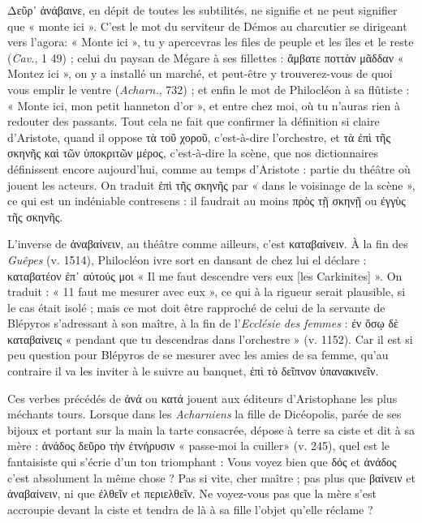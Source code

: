 \documentclass{book}%
\newcommand{\italique}[1]{\textit{#1}}%
\begin{document}
Δεῦρ᾽ ἀνάβαινε, en dépit de toutes les subtilités, ne signifie et ne peut signifier que « monte ici ». C'est le mot du serviteur de Démos au charcutier se dirigeant vers l'agora: « Monte ici », tu y apercevras les files de peuple et les îles et le reste (\italique{Cav.}, 1 49) ; celui du paysan de Mégare à ses fillettes : ἄμβατε ποττὰν μᾶδδαν « Montez ici », on y a installé un marché, et peut-être y trouverez-vous de quoi vous emplir le ventre (\italique{Acharn.}, 732) ; et enfin le mot de Philocléon à sa flûtiste : « Monte ici, mon petit hanneton d'or », et entre chez moi, où tu n'auras rien à redouter des passants. 
Tout cela ne fait que confirmer la définition si claire d'Aristote, quand il oppose τὰ τοῦ χοροῦ, c'est-à-dire l'orchestre, et τὰ ἐπὶ τῆς σκηνῆς καὶ τῶν ὑποκριτῶν μέρος, c'est-à-dire la scène, que nos dictionnaires définissent encore aujourd'hui, comme au temps d'Aristote : partie du théâtre où jouent les acteurs. 
On traduit ἐπὶ τῆς σκηνῆς par « dans le voisinage de la scène », ce qui est un indéniable contresens : il faudrait au moins πρὸς τῇ σκηνῇ ou ἐγγὺς τῆς σκηνῆς. 

L'inverse de ἀναβαίνειν, au théâtre comme ailleurs, c'est καταβαίνειν. À la fin des \italique{Guêpes} (v. 1514), Philocléon ivre sort en dansant de chez lui el déclare : καταβατέον ἐπ᾿ αὐτούς μοι « Il me faut descendre vers eux [les Carkinites] ». On traduit : « 11 faut me mesurer avec eux », ce qui à la rigueur serait plausible, si le cas était isolé ; mais ce mot doit être rapproché de celui de la servante de Blépyros s'adressant à son maître, à la fin de l'\italique{Ecclésie des femmes} : ἐν ὅσῳ δὲ καταβαίνεις « pendant que tu descendras dans l'orchestre » (v. 1152). Car il est si peu question pour Blépyros de se mesurer avec les amies de sa femme, qu'au contraire il va les inviter à le suivre au banquet, ἐπὶ τὸ δεῖπνον ὑπανακινεῖν.

Ces verbes précédés de ἀνά ou κατά jouent aux éditeurs d'Aristophane les plus méchants tours. Lorsque dans les \italique{Acharniens} la fille de Dicéopolis, parée de ses bijoux et portant sur la main la tarte consacrée, dépose à terre sa ciste et dit à sa mère : ἀνάδος δεῦρο τὴν ἐτνήρυσιν « passe-moi la cuiller» (v. 245), quel est le fantaisiste qui s'écrie d'un ton triomphant : Vous voyez bien que δός et ἀνάδος c'est absolument la même chose ? Pas si vite, cher maître ; pas plus que βαίνειν et ἀναβαίνειν, ni que ἐλθεῖν et περιελθεῖν. 
Ne voyez-vous pas que la mère s'est accroupie devant la ciste et tendra de là à sa fille l'objet qu'elle réclame ? 
\end{document}
